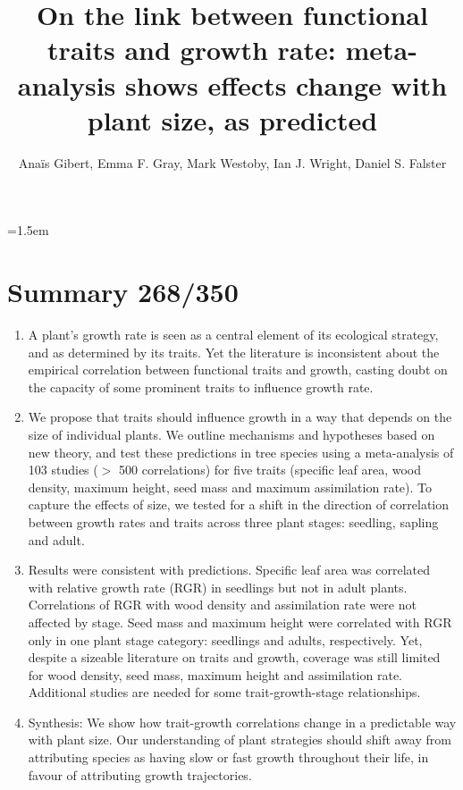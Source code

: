 \documentclass[a4paper,11pt]{article}
\title{On the link between functional traits and growth rate: meta-analysis shows effects change with plant size, as predicted}
\author{Ana{\"i}s Gibert\textasteriskcentered, Emma F. Gray, Mark Westoby, Ian J. Wright, Daniel S. Falster}
\affiliation{Biological Sciences, Macquarie University NSW 2109, Australia\\
\textasteriskcentered Email for correspondence: \texttt{anais.gibert@gmail.com}\\
Word count: ~5538 words (without supplementary material, Fig and ref)}
\date{}
\begin{document}
\mstitlepage
\noindent
\parindent=1.5em
\addtolength{\parskip}{.3em}
\doublespacing
\linenumbers
\section{Summary 268/350}\label{abstract}
\begin{enumerate}
\def\labelenumi{\arabic{enumi}.}
\itemsep1pt\parskip0pt
\item A plant's growth rate is seen as a central element of its ecological strategy, and as determined by its traits. Yet the literature is inconsistent about the empirical correlation between functional traits and growth, casting doubt on the capacity of some prominent traits to influence growth rate.

\item We propose that traits should influence growth in a way that depends on the size of individual plants. We outline mechanisms and hypotheses based on new theory, and test these predictions in tree species using a meta-analysis of 103 studies ($>$ 500 correlations) for five traits (specific leaf area, wood density, maximum height, seed mass and maximum assimilation rate). To capture the effects of size, we tested for a shift in the direction of correlation between growth rates and traits across three plant stages: seedling, sapling and adult.

\item Results were consistent with predictions. Specific leaf area was correlated with relative growth rate (RGR) in seedlings but not in adult plants. Correlations of RGR with wood density and assimilation rate were not affected by stage. Seed mass and maximum height were correlated with RGR only in one plant stage category: seedlings and adults, respectively. Yet, despite a sizeable literature on traits and growth, coverage was still limited for wood density, seed mass, maximum height and assimilation rate. Additional studies are needed for some trait-growth-stage relationships.

\item Synthesis: We show how trait-growth correlations change in a predictable way with plant size. Our understanding of plant strategies should shift away from attributing species as having slow or fast growth throughout their life, in favour of attributing growth trajectories.

\end{enumerate}

\clearpage
\end{document}
